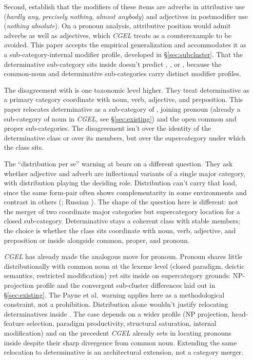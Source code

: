 \documentclass[12pt]{article}
\begin{document}
Second, \textcite[13--14]{payne2010} establish that the modifiers of these items are adverbs in attributive use (\textit{hardly any}, \textit{precisely nothing}, \textit{almost anybody}) and adjectives in postmodifier use (\textit{nothing absolute}). On a pronoun analysis, attributive position would admit adverbs as well as adjectives, which \textit{CGEL} treats as a counterexample to be avoided. This paper accepts the empirical generalization and accommodates it as a sub-category-internal modifier profile, developed in §\ref{sec:subcluster}. That the determinative sub-category sits inside  doesn't predict , , or , because the common-noun and determinative sub-categories carry distinct modifier profiles.

The disagreement with \textcite{payne2010} is one taxonomic level higher. They treat determinative as a primary category coordinate with noun, verb, adjective, and preposition. This paper relocates determinative as a sub-category of , joining pronoun (already a sub-category of noun in \textit{CGEL}, see §\ref{sec:existing}) and the open common and proper sub-categories. The disagreement isn't over the identity of the determinative class or over its members, but over the supercategory under which the class sits.

The \enquote{distribution per se} warning at \textcite[§10]{payne2010} bears on a different question. They ask whether adjective and adverb are inflectional variants of a single major category, with distribution playing the deciding role. Distribution can't carry that load, since the same form-pair often shows complementarity in some environments and contrast in others (; Russian ). The shape of the question here is different: not the merger of two coordinate major categories but supercategory location for a closed sub-category. Determinative stays a coherent class with stable members; the choice is whether the class sits coordinate with noun, verb, adjective, and preposition or inside  alongside common, proper, and pronoun.

\textit{CGEL} has already made the analogous move for pronoun. Pronoun shares little distributionally with common noun at the lexeme level (closed paradigm, deictic semantics, restricted modification) yet sits inside  on supercategory grounds: NP-projection profile and the convergent sub-cluster differences laid out in §\ref{sec:existing}. The Payne et al.\ warning applies here as a methodological constraint, not a prohibition. Distribution alone wouldn't justify relocating determinatives inside . The case depends on a wider profile (NP projection, head-feature selection, paradigm productivity, structural saturation, internal modification) and on the precedent \textit{CGEL} already sets in locating pronouns inside  despite their sharp divergence from common noun. Extending the same relocation to determinative is an architectural extension, not a category merger.
\end{document}
